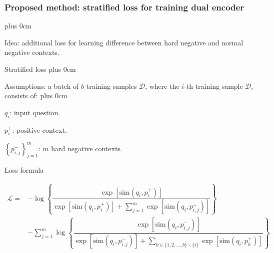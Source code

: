 \documentclass[11pt]{beamer}
\renewcommand{\raggedright}{\leftskip=0pt \rightskip=0pt plus 0cm}
\let\olditemize=\itemize
\renewenvironment{itemize}{\olditemize\raggedright}{\endlist}
\begin{document}
\begin{frame}
	\frametitle{Proposed method: stratified loss for training dual encoder}
	\begin{adjustwidth}{-2em}{0em}
		\begin{itemize}
			\item Idea: additional loss for learning difference between hard negative and normal negative contexts.
			\item Stratified loss
			\begin{itemize}
				\item Assumptions: a batch of $b$ training samples $\mathcal{D}$, where the $i$-th training sample $\mathcal{D}_i$ consists of:
				\begin{itemize}
					\item $q_i$: input question.
					\item $p_i^+$: positive context.
					\item $\left\{p_{i,j}^-\right\}_{j=1}^m$: $m$ hard negative contexts.
				\end{itemize}
				\item Loss formula
			\end{itemize}
		\end{itemize}
		\begin{scriptsize}
			\begin{equation}
				\label{eq:04}
				\begin{array}{ll}
					\mathcal{L} = &-\log\left\{\dfrac{\exp\left[{\text{sim}\left(q_i, p_i^+\right)}\right]}{\exp\left[{\text{sim}\left(q_i, p_i^+\right)}\right] + \sum\limits_{j=1}^m \exp\left[{\text{sim}\left(q_i, p_{i,j}^-\right)}\right]}\right\} \\[20pt]
					&-\sum\limits_{j=1}^m\log\left\{\dfrac{\exp\left[{\text{sim}\left(q_i, p_{i,j}^-\right)}\right]}{\exp\left[{\text{sim}\left(q_i, p_{i,j}^-\right)}\right] + \sum\limits_{k \in \{1,2,...,b\} \backslash \{i\}}\exp\left[\text{sim}\left(q_i, p_k^+\right)\right]}\right\}
				\end{array}
			\end{equation}
		\end{scriptsize}
	\end{adjustwidth}
\end{frame}
\end{document}
